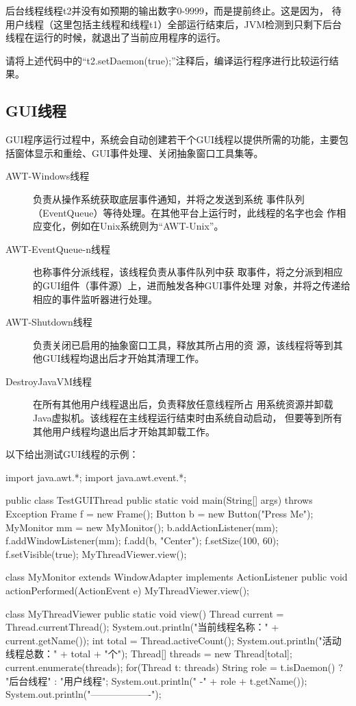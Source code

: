 
后台线程线程t2并没有如预期的输出数字$0$-$9999$，而是提前终止。这是因为，
待用户线程（这里包括主线程和线程t1）全部运行结束后，JVM检测到只剩下后台
线程在运行的时候，就退出了当前应用程序的运行。

请将上述代码中的“t2.setDaemon(true);”注释后，编译运行程序进行比较运行结果。


\subsection{GUI线程}

GUI程序运行过程中，系统会自动创建若干个GUI线程以提供所需的功能，主要包
括{\Blue\hei 窗体显示和重绘、GUI事件处理、关闭抽象窗口工具集等}。

\begin{description}
\item[AWT-Windows线程] 负责从操作系统获取底层事件通知，并将之发送到系统
  事件队列（EventQueue）等待处理。在其他平台上运行时，此线程的名字也会
  作相应变化，例如在Unix系统则为“AWT-Unix”。
\item[AWT-EventQueue-n线程] 也称事件分派线程，该线程负责从事件队列中获
  取事件，将之分派到相应的GUI组件（事件源）上，进而触发各种GUI事件处理
  对象，并将之传递给相应的事件监听器进行处理。
\item[AWT-Shutdown线程] 负责关闭已启用的抽象窗口工具，释放其所占用的资
  源，该线程将等到其他GUI线程均退出后才开始其清理工作。
\item[DestroyJavaVM线程] 在所有其他用户线程退出后，负责释放任意线程所占
  用系统资源并卸载Java虚拟机。该线程在主线程运行结束时由系统自动启动，
  但要等到所有其他用户线程均退出后才开始其卸载工作。
\end{description}

以下给出测试GUI线程的示例：


\begin{javaCode}
import java.awt.*;
import java.awt.event.*;

public class TestGUIThread {
  public static void main(String[] args) throws Exception {
    Frame f = new Frame();
    Button b = new Button("Press Me");
    MyMonitor mm = new MyMonitor();
    b.addActionListener(mm);
    f.addWindowListener(mm);
    f.add(b, "Center");
    f.setSize(100, 60);
    f.setVisible(true);
    MyThreadViewer.view();
  }
}

class MyMonitor extends WindowAdapter implements ActionListener {
  public void actionPerformed(ActionEvent e) {
    MyThreadViewer.view();
  }
}

class MyThreadViewer {
  public static void view() {
    Thread current = Thread.currentThread();
    System.out.println("当前线程名称：" + current.getName());
    int total = Thread.activeCount();
    System.out.println("活动线程总数：" + total + "个");
    Thread[] threads = new Thread[total];
    current.enumerate(threads);
    for(Thread t: threads) {
      String role = t.isDaemon() ? "后台线程" : "用户线程";
      System.out.println("   -" + role + t.getName());
    }
    System.out.println("-------------------");
  }
}
\end{javaCode}


